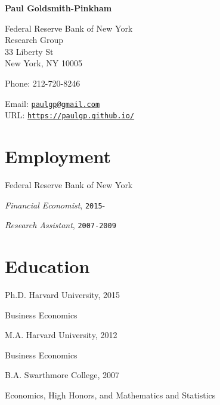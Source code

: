 \documentclass[letterpaper]{article}
\renewenvironment{itemize}{
  \begin{list}{}
    { \setlength{\itemsep}{5pt}
      \setlength{\parsep}{0pt}
      \setlength{\topsep}{0pt}
      \setlength{\leftmargin}{0em} } }{
  \end{list}}
\begin{document}
{\huge\bf  Paul Goldsmith-Pinkham}

\bigskip

Federal Reserve Bank of New York \\
Research Group \\
33 Liberty St \\
New York, NY 10005

\medskip

Phone: 212-720-8246

\medskip

Email: \href{mailto:paulgp@gmail.com}{\tt paulgp@gmail.com} \\
URL: \href{http://https://paulgp.github.io//}{\tt https://paulgp.github.io/} 

\section*{Employment}
\begin{itemize}
\item Federal Reserve Bank of New York
  \begin{itemize}
  \item \qquad \textit{Financial Economist}, \texttt{2015}-
  \item \qquad \textit{Research Assistant}, \texttt{2007-2009}
  \end{itemize}
\end{itemize}

\section*{Education}

\begin{itemize}
\item Ph.D. Harvard University, 2015
  \begin{itemize}
  \item Business Economics
  \end{itemize}
\item M.A. Harvard University, 2012
  \begin{itemize}
  \item Business Economics
  \end{itemize}
\item B.A. Swarthmore College, 2007
  \begin{itemize}
  \item Economics, High Honors, and Mathematics and Statistics
  \end{itemize}
\end{itemize}
\end{document}
